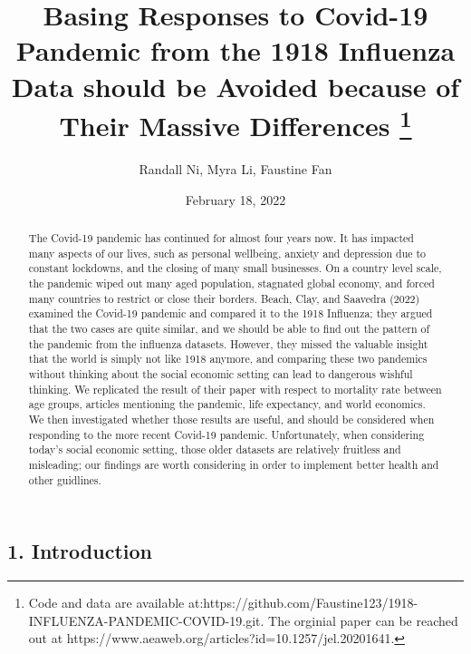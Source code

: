 \documentclass[
]{article}
\title{Basing Responses to Covid-19 Pandemic from the 1918 Influenza
Data should be Avoided because of Their Massive Differences \footnote{Code
  and data are available
  at:https://github.com/Faustine123/1918-INFLUENZA-PANDEMIC-COVID-19.git.
  The orginial paper can be reached out at
  https://www.aeaweb.org/articles?id=10.1257/jel.20201641.}}
\author{Randall Ni, Myra Li, Faustine Fan}
\date{February 18, 2022}
\begin{document}
\maketitle
\begin{abstract}
The Covid-19 pandemic has continued for almost four years now. It has
impacted many aspects of our lives, such as personal wellbeing, anxiety
and depression due to constant lockdowns, and the closing of many small
businesses. On a country level scale, the pandemic wiped out many aged
population, stagnated global economy, and forced many countries to
restrict or close their borders. Beach, Clay, and Saavedra (2022)
examined the Covid-19 pandemic and compared it to the 1918 Influenza;
they argued that the two cases are quite similar, and we should be able
to find out the pattern of the pandemic from the influenza datasets.
However, they missed the valuable insight that the world is simply not
like 1918 anymore, and comparing these two pandemics without thinking
about the social economic setting can lead to dangerous wishful
thinking. We replicated the result of their paper with respect to
mortality rate between age groups, articles mentioning the pandemic,
life expectancy, and world economics. We then investigated whether those
results are useful, and should be considered when responding to the more
recent Covid-19 pandemic. Unfortunately, when considering today's social
economic setting, those older datasets are relatively fruitless and
misleading; our findings are worth considering in order to implement
better health and other guidlines.
\end{abstract}
\ifdefined\Shaded\renewenvironment{Shaded}{\begin{tcolorbox}[breakable, boxrule=0pt, enhanced, interior hidden, frame hidden, sharp corners, borderline west={3pt}{0pt}{shadecolor}]}{\end{tcolorbox}}\fi

\hypertarget{introduction}{%
\subsection{1. Introduction}\label{introduction}}
\end{document}
